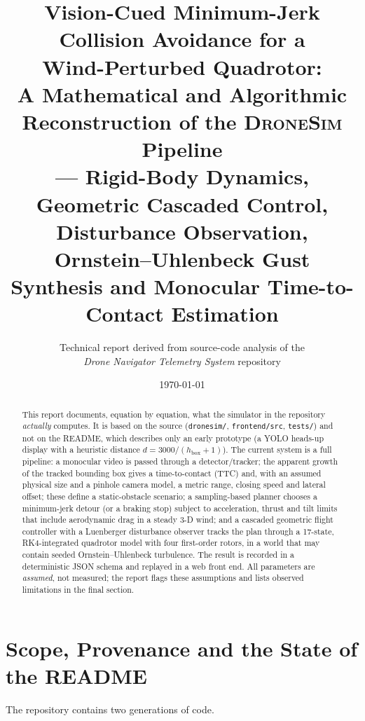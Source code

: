 \documentclass[11pt,a4paper]{article}
\title{\vspace{-1.2cm}\textbf{Vision-Cued Minimum-Jerk Collision Avoidance for a\\
Wind-Perturbed Quadrotor:}\\[4pt]
\large A Mathematical and Algorithmic Reconstruction of the \textsc{DroneSim} Pipeline\\
--- Rigid-Body Dynamics, Geometric Cascaded Control, Disturbance Observation,\\
Ornstein--Uhlenbeck Gust Synthesis and Monocular Time-to-Contact Estimation}
\author{Technical report derived from source-code analysis of the\\
\emph{Drone Navigator Telemetry System} repository}
\date{\today}
\newcommand{\code}[1]{\texttt{\small #1}}
\begin{document}
\maketitle
\thispagestyle{fancy}

\begin{abstract}
\noindent
This report documents, equation by equation, what the simulator in the repository \emph{actually} computes.
It is based on the source (\code{dronesim/}, \code{frontend/src}, \code{tests/}) and not on the README, which describes
only an early prototype (a YOLO heads-up display with a heuristic distance $d = 3000/(h_{\text{box}}+1)$).
The current system is a full pipeline: a monocular video is passed through a detector/tracker; the apparent growth of
the tracked bounding box gives a time-to-contact (TTC) and, with an assumed physical size and a pinhole camera model, a metric
range, closing speed and lateral offset; these define a static-obstacle scenario; a sampling-based planner chooses a
minimum-jerk detour (or a braking stop) subject to acceleration, thrust and tilt limits that include aerodynamic
drag in a steady 3-D wind; and a cascaded geometric flight controller with a Luenberger disturbance observer tracks the
plan through a 17-state, RK4-integrated quadrotor model with four first-order rotors, in a world that may contain
seeded Ornstein--Uhlenbeck turbulence. The result is recorded in a deterministic JSON schema and replayed in a
web front end. All parameters are \emph{assumed}, not measured; the report flags these assumptions and lists
observed limitations in the final section.
\end{abstract}

\tableofcontents
\newpage

\section{Scope, Provenance and the State of the README}
The repository contains two generations of code.
\end{document}
